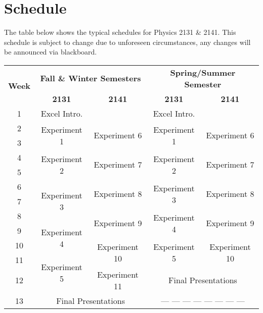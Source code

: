 \section*{Schedule}
The table below shows the typical schedules for Physics 2131 \& 2141.
This schedule is subject to change due to unforeseen circumstances, any changes will be announced via blackboard.
\begin{table}[ht]
	\centering
	\begin{tabular}{ |c||c|c||c|c| } 
	 \hline
	 \multirow{2}{*}{\textbf{Week}} & \multicolumn{2}{c||}{\textbf{Fall \& Winter Semesters}} & \multicolumn{2}{c|}{\textbf{Spring/Summer Semester}} \\ 
	 \cline{2-5}
	  & \textbf{2131} & \textbf{2141} & \textbf{2131} & \textbf{2141} \\
	 \hline
	 1 & Excel Intro. &  & Excel Intro. &  \\ 
	 \hline 
	 2 & \multirow{2}{*}{Experiment 1} & \multirow{2}{*}{Experiment 6} & \multirow{2}{*}{Experiment 1} & \multirow{2}{*}{Experiment 6} \\ 
	 \cline{1-1}
	 3 &  &  &  &   \\ 
	 \hline
	 4 & \multirow{2}{*}{Experiment 2} & \multirow{2}{*}{Experiment 7} & \multirow{2}{*}{Experiment 2} & \multirow{2}{*}{Experiment 7} \\ 
	 \cline{1-1}
	 5 &  &  &  &   \\ 
	 \hline
	 6 & \multirow{3}{*}{Experiment 3} & \multirow{2}{*}{Experiment 8} & \multirow{2}{*}{Experiment 3} & \multirow{2}{*}{Experiment 8} \\ 
	 \cline{1-1}
	 7 &  &  &  &   \\ 
	 \cline{1-1} \cline{3-5}
	 8 &  & \multirow{2}{*}{Experiment 9} & \multirow{2}{*}{Experiment 4} & \multirow{2}{*}{Experiment 9} \\ 
	 \cline{1-2}
	 9 & \multirow{2}{*}{Experiment 4} &  &  &   \\ 
	 \cline{1-1} \cline{3-5}
	 10 &  & \multirow{2}{*}{Experiment 10} & \multirow{2}{*}{Experiment 5} & \multirow{2}{*}{Experiment 10} \\ 
	 \cline{1-2}
	 11 & \multirow{2}{*}{Experiment 5} &  &  &   \\ 
	 \cline{1-1} \cline{3-5}
	 12 &  & Experiment 11 & \multicolumn{2}{c|}{Final Presentations} \\ 
	 \hline
	 13 & \multicolumn{2}{c||}{Final Presentations} & \multicolumn{2}{c|}{--- --- --- --- --- --- --- ---}  \\ 
	 \hline
	\end{tabular}
\end{table}

